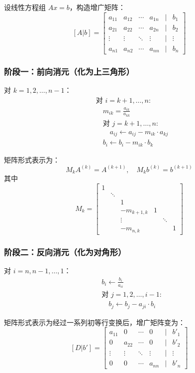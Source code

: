 设线性方程组 $Ax = b$，构造增广矩阵：
\[
[A|b] = \begin{bmatrix}
a_{11} & a_{12} & \cdots & a_{1n} & | & b_1 \\
a_{21} & a_{22} & \cdots & a_{2n} & | & b_2 \\
\vdots & \vdots & \ddots & \vdots & | & \vdots \\
a_{n1} & a_{n2} & \cdots & a_{nn} & | & b_n
\end{bmatrix}
\]

\subsubsection{阶段一：前向消元（化为上三角形）}

对 $k = 1, 2, \ldots, n-1$：
\begin{align*}
&\text{对 } i = k+1, \ldots, n: \\
&\quad m_{ik} = \frac{a_{ik}}{a_{kk}} \\
&\quad \text{对 } j = k+1, \ldots, n: \\
&\quad\quad a_{ij} \leftarrow a_{ij} - m_{ik} \cdot a_{kj} \\
&\quad b_i \leftarrow b_i - m_{ik} \cdot b_k
\end{align*}

矩阵形式表示为：
\[
M_k A^{(k)} = A^{(k+1)}, \quad M_k b^{(k)} = b^{(k+1)}
\]
其中
\[
M_k = \begin{bmatrix}
1 & & & & \\
& \ddots & & & \\
& & 1 & & \\
& & -m_{k+1,k} & 1 & \\
& & \vdots & & \ddots \\
& & -m_{n,k} & & & 1
\end{bmatrix}
\]

\subsubsection{阶段二：反向消元（化为对角形）}

对 $i = n, n-1, \ldots, 1$：
\begin{align*}
&b_i \leftarrow \frac{b_i}{a_{ii}} \\
&\text{对 } j = 1, 2, \ldots, i-1: \\
&\quad b_j \leftarrow b_j - a_{ji} \cdot b_i
\end{align*}

矩阵形式表示为经过一系列初等行变换后，增广矩阵变为：
\[
[D|b'] = \begin{bmatrix}
a_{11} & 0 & \cdots & 0 & | & b'_1 \\
0 & a_{22} & \cdots & 0 & | & b'_2 \\
\vdots & \vdots & \ddots & \vdots & | & \vdots \\
0 & 0 & \cdots & a_{nn} & | & b'_n
\end{bmatrix}
\]

